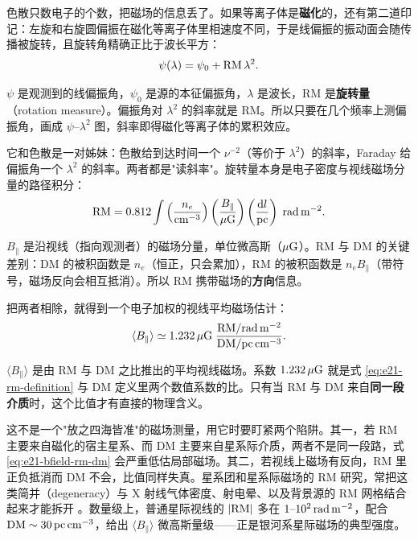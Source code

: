 色散只数电子的个数，把磁场的信息丢了。如果等离子体是\textbf{磁化}的，还有第二道印记：左旋和右旋圆偏振在磁化等离子体里相速度不同，于是线偏振的振动面会随传播被旋转，且旋转角精确正比于波长平方：
\begin{equation}
  \psi(\lambda)=\psi_0+{\rm RM}\,\lambda^2 .
  \label{eq:e21-rm-angle}
\end{equation}
\begin{formulaexplain}
\(\psi\) 是观测到的线偏振角，\(\psi_0\) 是源的本征偏振角，\(\lambda\) 是波长，RM 是\textbf{旋转量}（rotation measure）。偏振角对 \(\lambda^2\) 的斜率就是 RM。所以只要在几个频率上测偏振角，画成 \(\psi\)–\(\lambda^2\) 图，斜率即得磁化等离子体的累积效应。
\end{formulaexplain}
它和色散是一对姊妹：色散给到达时间一个 \(\nu^{-2}\)（等价于 \(\lambda^2\)）的斜率，Faraday 给偏振角一个 \(\lambda^2\) 的斜率。两者都是"读斜率"。旋转量本身是电子密度与视线磁场分量的路径积分：
\begin{equation}
  {\rm RM}
  =
  0.812
  \int
  \left(\frac{n_e}{{\rm cm^{-3}}}\right)
  \left(\frac{B_\parallel}{\mu{\rm G}}\right)
  \left(\frac{{\rm d}l}{\rm pc}\right)
  \;{\rm rad\,m^{-2}} .
  \label{eq:e21-rm-definition}
\end{equation}
\begin{formulaexplain}
\(B_\parallel\) 是沿视线（指向观测者）的磁场分量，单位微高斯（\(\mu{\rm G}\)）。RM 与 DM 的关键差别：DM 的被积函数是 \(n_e\)（恒正，只会累加），RM 的被积函数是 \(n_e B_\parallel\)（带符号，磁场反向会相互抵消）。所以 RM 携带磁场的\textbf{方向}信息。
\end{formulaexplain}
把两者相除，就得到一个电子加权的视线平均磁场估计：
\begin{equation}
  \langle B_\parallel\rangle
  \simeq
  1.232\,\mu{\rm G}\;
  \frac{{\rm RM}/{\rm rad\,m^{-2}}}{{\rm DM}/{\rm pc\,cm^{-3}}}.
  \label{eq:e21-bfield-rm-dm}
\end{equation}
\begin{formulaexplain}
\(\langle B_\parallel\rangle\) 是由 RM 与 DM 之比推出的平均视线磁场。系数 \(1.232\,\mu{\rm G}\) 就是式 \eqref{eq:e21-rm-definition} 与 DM 定义里两个数值系数的比。只有当 RM 与 DM 来自\textbf{同一段介质}时，这个比值才有直接的物理含义。
\end{formulaexplain}
这不是一个"放之四海皆准"的磁场测量，用它时要盯紧两个陷阱。其一，若 RM 主要来自磁化的宿主星系、而 DM 主要来自星系际介质，两者不是同一段路，式 \eqref{eq:e21-bfield-rm-dm} 会严重低估局部磁场。其二，若视线上磁场有反向，RM 里正负抵消而 DM 不会，比值同样失真。星系团和星系际磁场的 RM 研究，常把这类简并（degeneracy）与 X 射线气体密度、射电晕、以及背景源的 RM 网格结合起来才能拆开 \citep{2002ARA&A..40..319C}。数量级上，普通星际视线的 \(|{\rm RM}|\) 多在 \(1\text{--}10^2\,{\rm rad\,m^{-2}}\)，配合 \({\rm DM}\sim30\,{\rm pc\,cm^{-3}}\)，给出 \(\langle B_\parallel\rangle\) 微高斯量级——正是银河系星际磁场的典型强度。

